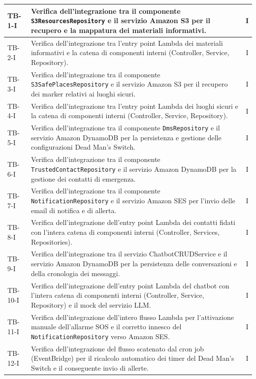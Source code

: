 \documentclass[a4paper,12pt]{article}
\newcommand{\ignoreglossary}{}
\begin{document}
\begin{longtable}{|l|p{10cm}|c|}
    TB-1-I & Verifica dell'integrazione tra il componente \texttt{S3ResourcesRepository} e il servizio Amazon S3 per il recupero e la mappatura dei materiali informativi. & I \\
    \hline
    TB-2-I & Verifica dell'integrazione tra l'entry point Lambda dei materiali informativi e la catena di componenti interni (Controller, Service, \ignoreglossary{Repository}). & I \\
    \hline
    TB-3-I & Verifica dell'integrazione tra il componente \texttt{S3SafePlacesRepository} e il servizio Amazon S3 per il recupero dei marker relativi ai luoghi sicuri. & I \\
    \hline
    TB-4-I & Verifica dell'integrazione tra l'entry point Lambda dei luoghi sicuri e la catena di componenti interni (Controller, Service, \ignoreglossary{Repository}). & I \\
    \hline
    TB-5-I & Verifica dell'integrazione tra il componente \texttt{DmsRepository} e il servizio Amazon DynamoDB per la persistenza e gestione delle configurazioni Dead Man's Switch. & I \\
    \hline
    TB-6-I & Verifica dell'integrazione tra il componente \texttt{TrustedContactRepository} e il servizio Amazon DynamoDB per la gestione dei contatti di emergenza. & I \\
    \hline
    TB-7-I & Verifica dell'integrazione tra il componente \texttt{NotificationRepository} e il servizio Amazon SES per l'invio delle email di notifica e di allerta. & I \\
    \hline
    TB-8-I & Verifica dell'integrazione dell'entry point Lambda dei contatti fidati con l'intera catena di componenti interni (Controller, Services, Repositories). & I \\
    \hline
    TB-9-I & Verifica dell'integrazione tra il servizio ChatbotCRUDService e il servizio Amazon DynamoDB per la persistenza delle conversazioni e della cronologia dei messaggi. & I \\
    \hline
    TB-10-I & Verifica dell'integrazione dell'entry point Lambda del chatbot con l'intera catena di componenti interni (Controller, Service, \ignoreglossary{Repository}) e il mock del servizio LLM. & I \\
    \hline
    TB-11-I & Verifica dell'integrazione dell'intero flusso Lambda per l'attivazione manuale dell'allarme SOS e il corretto innesco del \texttt{NotificationRepository} verso Amazon SES. & I \\
    \hline
    TB-12-I & Verifica dell'integrazione del flusso scatenato dal cron job (EventBridge) per il ricalcolo automatico dei timer del Dead Man's Switch e il conseguente invio di allerte. & I \\

\end{longtable}
\end{document}
